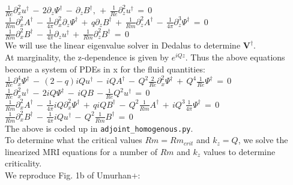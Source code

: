\documentclass[letterpaper,12pt]{article}
\newcommand\reye{\mathrel{Re}}
\newcommand\reym{\mathrel{Rm}}
\begin{document}
$\frac{1}{\reye}\partial_x^2 u^\dagger \, - \, 2 \partial_z \Psi^\dagger \, - \, \partial_z B^\dagger, \, + \, \frac{1}{\reye}\partial_z^2 u^\dagger \, = \, 0$ \\

$\frac{1}{\reym} \partial_x^2 A^\dagger \, - \, \frac{1}{4\pi} \partial_x^2 \partial_z \Psi^\dagger \, + \, q \partial_z B^\dagger  \,+ \, \frac{1}{\reym} \partial_z^2 A^\dagger \, - \, \frac{1}{4\pi} \partial_z^3 \Psi^\dagger \, = \, 0$ \\

$\frac{1}{\reym} \partial_x^2 B^\dagger \, - \, \frac{1}{4\pi} \partial_z u^\dagger \, + \, \frac{1}{\reym} \partial_z^2 B^\dagger \, = \, 0$ \\

We will use the linear eigenvalue solver in Dedalus to determine $\mathbf{V}^\dagger$. \\

At marginality, the z-dependence is given by $e^{iQz}$. Thus the above equations become a system of PDEs in x for the fluid quantities: \\

$\frac{1}{\reye}\partial_x^4 \Psi^\dagger \, - \, (2 - q) i Q u^\dagger \, - \,  i Q A^\dagger \, - \, Q^2 \frac{2}{\reye} \partial_x^2 \Psi^\dagger \, + \, Q^4 \frac{1}{\reye} \Psi^\dagger \, = \, 0$ \\

$\frac{1}{\reye}\partial_x^2 u^\dagger \, - \, 2 i Q \Psi^\dagger \, - \, i Q B \, - \frac{1}{\reye} Q^2 u^\dagger \, = \, 0$ \\

$\frac{1}{\reym} \partial_x^2 A^\dagger \, - \, \frac{1}{4\pi} i Q \partial_x^2 \Psi^\dagger \, + \, q i Q B^\dagger \, - \, Q^2 \frac{1}{\reym} A^\dagger \, + \, i Q^3 \frac{1}{4\pi} \Psi^\dagger \, = \, 0$ \\

$\frac{1}{\reym} \partial_x^2 B^\dagger \, - \, \frac{1}{4\pi} i Q u^\dagger \, - \, Q^2 \frac{1}{\reym} B^\dagger \, = \, 0$ \\

The above is coded up in \texttt{adjoint\_homogenous.py}. \\

To determine what the critical values $\reym = \reym_{crit}$ and $k_z = Q$, we solve the linearized MRI equations for a number of $\reym$ and $k_z$ values to determine criticality. \\

We reproduce Fig. 1b of Umurhan+: \\
\end{document}
